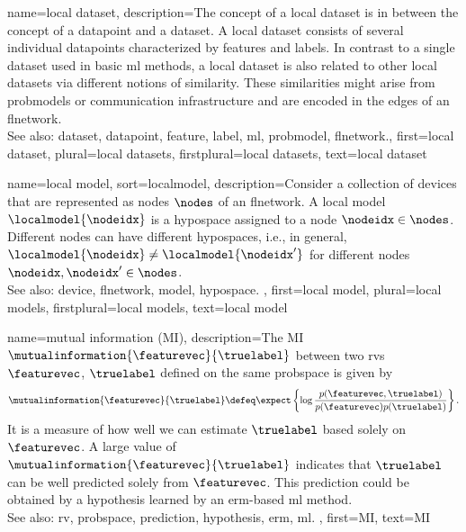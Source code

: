 {name={local dataset},
	description={The concept of a local \gls{dataset} is 
		in between the concept of a \gls{datapoint} and a \gls{dataset}. A local \gls{dataset} consists of several 
		individual \glspl{datapoint} characterized by \glspl{feature} and \glspl{label}. 
		In contrast to a single \gls{dataset} used in basic \gls{ml} methods, a local \gls{dataset} is also 
		related to other local \glspl{dataset} via different notions of similarity. These similarities 
		might arise from \glspl{probmodel} or communication infrastructure and 
		are encoded in the edges of an \gls{flnetwork}.
				\\
		See also: \gls{dataset}, \gls{datapoint}, \gls{feature}, \gls{label}, \gls{ml}, \gls{probmodel}, \gls{flnetwork}.},
	first={local dataset},
	plural={local datasets}, 
	firstplural={local datasets}, 
	text={local dataset}
}
	
{name={local model},
sort={localmodel},
	description={Consider a collection of \glspl{device} that are represented 
		as nodes $\nodes$ of an \gls{flnetwork}. A local \gls{model} $\localmodel{\nodeidx}$ 
		is a \gls{hypospace} assigned to a node $\nodeidx \in \nodes$. Different nodes can have 
		different \glspl{hypospace}, i.e., in general, $\localmodel{\nodeidx} \neq \localmodel{\nodeidx'}$ 
		for different nodes $\nodeidx, \nodeidx' \in \nodes$. 
				\\
		See also: \gls{device}, \gls{flnetwork}, \gls{model}, \gls{hypospace}. },
	first={local model},
	plural={local models}, 
	firstplural={local models}, 
	text={local model}
}
	
{name={mutual information (MI)},
 	description={The MI $\mutualinformation{\featurevec}{\truelabel}$ 
 		between two \glspl{rv} $\featurevec$, $\truelabel$ defined on the same \gls{probspace} 
 		is given by \cite{coverthomas} $$\mutualinformation{\featurevec}{\truelabel} \defeq 
		\expect \left\{ \log \frac{p (\featurevec,\truelabel)}{p(\featurevec)p(\truelabel)} \right\}.$$ 
		It is a \gls{measure} of how well we can estimate $\truelabel$ based 
		solely on $\featurevec$. A large value of $\mutualinformation{\featurevec}{\truelabel}$ indicates that 
		$\truelabel$ can be well predicted solely from $\featurevec$. This \gls{prediction} could be obtained by a 
		\gls{hypothesis} learned by an \gls{erm}-based \gls{ml} method. 
				\\
		See also: \gls{rv}, \gls{probspace}, \gls{prediction}, \gls{hypothesis}, \gls{erm}, \gls{ml}. }, 
	first={MI}, 
	text={MI} 
}

